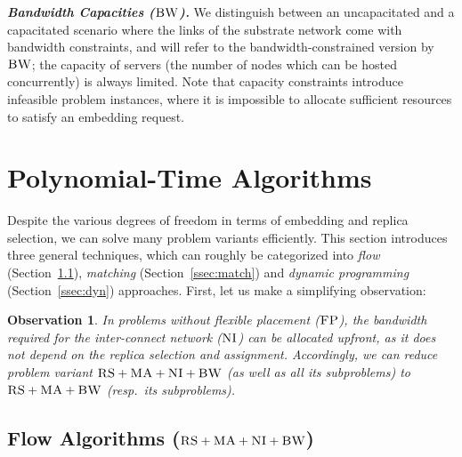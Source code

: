 \documentclass[conference,10pt]{IEEEtran}
\newcommand{\CC}{\textsc{NI}}
\newcommand{\FP}{\textsc{FP}}
\newcommand{\RS}{\textsc{RS}}
\newcommand{\BW}{\textsc{BW}}
\newcommand{\MA}{\textsc{MA}}
\newtheorem{obs}{Observation}
\newcommand{\CostTrans}{\ensuremath{b_1}}
\newcommand{\CostCom}{\ensuremath{b_2}}
\begin{document}


\textbf{\emph{Bandwidth Capacities ($\BW$).}}
We distinguish between an uncapacitated and a capacitated scenario where the links
of the substrate network come with bandwidth
constraints, and will refer to the bandwidth-constrained version by $\BW$; the capacity of servers
(the number of nodes which can be hosted concurrently) is always limited.
Note that capacity constraints introduce infeasible problem instances, where it is impossible to
allocate sufficient resources to satisfy an embedding request.


\section{Polynomial-Time Algorithms}\label{sec:poly}


Despite the various degrees of freedom in terms of embedding and replica selection,
we can solve many problem variants efficiently.
 This section introduces three general techniques,
 which can roughly be categorized into
 \emph{flow} (Section~\ref{ssec:flow}), \emph{matching} (Section~\ref{ssec:match}) and \emph{dynamic programming}
 (Section~\ref{ssec:dyn}) approaches.
First, let us make a simplifying observation:
\begin{obs}\label{obs:nofp}
In problems without flexible placement ($\FP$),
the bandwidth required
for the inter-connect network ($\CC$) can be allocated \emph{upfront}, 
as it
does not depend on the replica
selection and assignment.
Accordingly, we can reduce problem variant $\RS+\MA+\CC +\BW$ (as well as all its subproblems)
to $\RS+\MA+\BW$ (resp.~its subproblems).

\end{obs}

\subsection{Flow Algorithms ($\RS+\MA+\CC+\BW$)}\label{ssec:flow}
\end{document}
